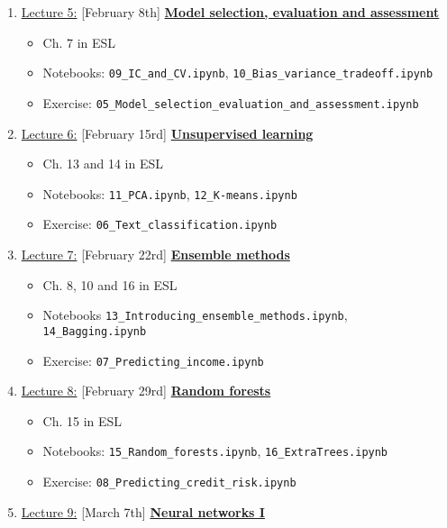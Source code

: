 \documentclass[12pt, a4paper]{article}
\begin{document}
\begin{enumerate}
{\begin{itemize}
            \end{itemize}
    }
 \item[] \underline{Lecture 5:} [February 8th] \underline{\bf Model selection, evaluation and assessment}
    {\small
          \begin{itemize}
            \item Ch. 7 in ESL
            \item Notebooks: \texttt{09\_IC\_and\_CV.ipynb}, \texttt{10\_Bias\_variance\_tradeoff.ipynb}
            \item Exercise: \texttt{05\_Model\_selection\_evaluation\_and\_assessment.ipynb}
          \end{itemize}
    }
  \item[] \underline{Lecture 6:} [February 15rd] \underline{\bf Unsupervised learning}
    {\small
          \begin{itemize}
            \item Ch. 13 and 14 in ESL
            \item Notebooks: \texttt{11\_PCA.ipynb}, \texttt{12\_K-means.ipynb}
            \item Exercise: \texttt{06\_Text\_classification.ipynb}
          \end{itemize}
    }
  \item[] \underline{Lecture 7:} [February 22rd] \underline{\bf Ensemble methods}
    {\small
          \begin{itemize}
            \item Ch. 8, 10 and  16 in ESL
            \item Notebooks \texttt{13\_Introducing\_ensemble\_methods.ipynb}, \texttt{14\_Bagging.ipynb}
            \item Exercise: \texttt{07\_Predicting\_income.ipynb}
          \end{itemize}
    }
  \item[] \underline{Lecture 8:} [February 29rd] \underline{\bf Random forests}
    {\small
          \begin{itemize}
            \item Ch. 15 in ESL
            \item Notebooks: \texttt{15\_Random\_forests.ipynb}, \texttt{16\_ExtraTrees.ipynb}
            \item Exercise: \texttt{08\_Predicting\_credit\_risk.ipynb}
          \end{itemize}
    }
  \item[] \underline{Lecture 9:} [March 7th] \underline{\bf Neural networks I}

\end{enumerate}
\end{document}
